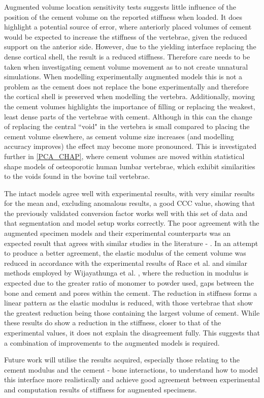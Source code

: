 Augmented volume location sensitivity tests suggests little influence of the
position of the cement volume on the reported stiffness when loaded.  It does
highlight a potential source of error, where anteriorly placed volumes of
cement would be expected to increase the stiffness of the vertebrae, given the
reduced support on the anterior side.  However, due to the yielding interface
replacing the dense cortical shell, the result is a reduced stiffness.
Therefore care needs to be taken when investigating cement volume movement as
to not create unnatural simulations.  When modelling experimentally augmented
models this is not a problem as the cement does not replace the bone
experimentally and therefore the cortical shell is preserved when modelling the
vertebra.  Additionally, moving the cement volumes highlights the importance of
filling or replacing the weakest, least dense parts of the vertebrae with
cement.  Although in this can the change of replacing the central ``void" in
the vertebra is small compared to placing the cement volume elsewhere, as
cement volume size increases (and modelling accuracy improves) the effect may
become more pronounced.  This is investigated further in \cref{PCA_CHAP}, where
cement volumes are moved within statistical shape models of osteoporotic human
lumbar vertebrae, which exhibit similarities to the voids found in the bovine
tail vertebrae.

The intact models agree well with experimental results, with very similar
results for the mean and, excluding anomalous results, a good CCC value,
showing that the previously validated conversion factor works well with this
set of data and that segmentation and model setup works correctly. The poor
agreement with the augmented specimen models and their experimental
counterparts was an expected result that agrees with similar studies in the
literature - \cite{Wijayathunga2008}. In an attempt to produce a better
agreement, the elastic modulus of the cement volume was reduced in accordance
with the experimental results of Race et al. \cite{Race2007} and similar
methods employed by Wijayathunga et al. \cite{Wijayathunga2008}, where the
reduction in modulus is expected due to the greater ratio of monomer to powder
used, gaps between the bone and cement and pores within the cement. The
reduction in stiffness forms a linear pattern as the elastic modulus is
reduced, with those vertebrae that show the greatest reduction being those
containing the largest volume of cement. While these results do show a
reduction in the stiffness, closer to that of the experimental values, it does
not explain the disagreement fully. This suggests that a combination of
improvements to the augmented models is required.

Future work will utilise the results acquired, especially those relating to the
cement modulus and the cement - bone interactions, to understand how to model
this interface more realistically and achieve good agreement between
experimental and computation results of stiffness for augmented specimens.


